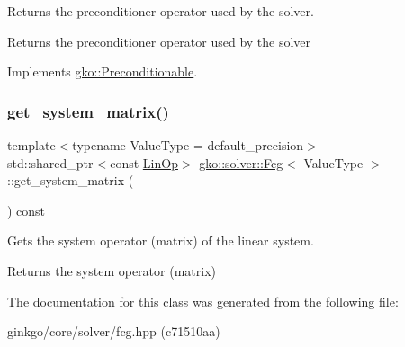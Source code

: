Returns the preconditioner operator used by the solver. 

\begin{DoxyReturn}{Returns}
the preconditioner operator used by the solver 
\end{DoxyReturn}


Implements \hyperlink{classgko_1_1Preconditionable_ad9545089aef0dfc83bc7a74e5bf1d748}{gko\+::\+Preconditionable}.

\mbox{\label{classgko_1_1solver_1_1Fcg_aae8c67d27df239c18750845275605c87}} 
\subsubsection{\texorpdfstring{get\+\_\+system\+\_\+matrix()}{get\_system\_matrix()}}
{\footnotesize\ttfamily template$<$typename Value\+Type  = default\+\_\+precision$>$ \\
std\+::shared\+\_\+ptr$<$const \hyperlink{classgko_1_1LinOp}{Lin\+Op}$>$ \hyperlink{classgko_1_1solver_1_1Fcg}{gko\+::solver\+::\+Fcg}$<$ Value\+Type $>$\+::get\+\_\+system\+\_\+matrix (\begin{DoxyParamCaption}{ }\end{DoxyParamCaption}) const\hspace{0.3cm}{\ttfamily [inline]}}



Gets the system operator (matrix) of the linear system. 

\begin{DoxyReturn}{Returns}
the system operator (matrix) 
\end{DoxyReturn}


The documentation for this class was generated from the following file\+:\begin{DoxyCompactItemize}
\item 
ginkgo/core/solver/fcg.\+hpp (c71510aa)\end{DoxyCompactItemize}

